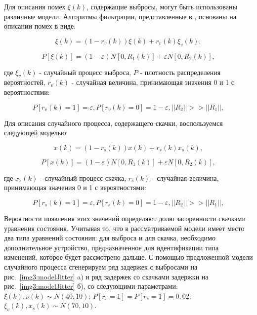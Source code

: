 Для описания помех $\xi(k)$, содержащие выбросы, могут быть использованы различные модели. Алгоритмы фильтрации, представленные в \cite{masreliez_ieee, masreliez_martin, ershov_lipcer, ershov}, основаны на описании помех в виде:


\begin{equation}\label{eq3:v}
\xi(k)=(1-r_v(k))\xi(k)+r_v(k)\xi_v(k),
\end{equation}

\begin{equation}\label{eq3:vp}
P[\xi(k)]=(1-\varepsilon)N[0,R_1(k)]+\varepsilon N[0,R_2(k)],
\end{equation}

\noindent где $\xi_v(k)$ - случайный процесс выброса, $P$ - плотность распределения вероятностей, $r_v(k)$ - случайная величина, принимающая значения 0 и 1 с вероятностями:

\begin{equation}\label{eq3:vpp}
P[r_v(k)=1]=\varepsilon, P[r_v(k)=0]=1-\varepsilon, ||R_2||>>||R_1||,
\end{equation}


Для описания случайного процесса, содержащего скачки, воспользуемся следующей моделью:

\begin{equation}\label{eq3:s}
x(k)=(1-r_s(k))x(k)+r_s(k)x_s(k),
\end{equation}

\begin{equation}\label{eq3:sp}
P[x(k)]=(1-\varepsilon)N[0,R_1(k)]+\varepsilon N[0,R_2(k)],
\end{equation}

\noindent где $x_s(k)$ - случайный процесс скачка, $r_s(k)$ - случайная величина, принимающая значения 0 и 1 с вероятностями:

\begin{equation}\label{eq3:spp}
P[r_s(k)=1]=\varepsilon, P[r_s(k)=0]=1-\varepsilon, ||R_2||>>||R_1||,
\end{equation}

Вероятности появления этих значений определяют долю засоренности скачками уравнения состояния. 
Учитывая то, что в рассматриваемой модели имеет место два типа уравнений состояния: для выброса и для скачка, необходимо дополнительное устройство, предназначенное для идентификации типа изменений, которое будет рассмотрено дальше.
С помощью предложенной модели случайного процесса сгенерируем ряд задержек с выбросами на рис. \ref{img3:modelJitter} a) и ряд задержек со скачками задержки на рис. \ref{img3:modelJitter} б),
со следующими параметрами: $\xi(k),\nu(k)\sim N(40,10)$; $P[r_v=1]=P[r_s=1]=0,02$; $\xi_v(k),x_s(k)\sim N(70,10)$.

